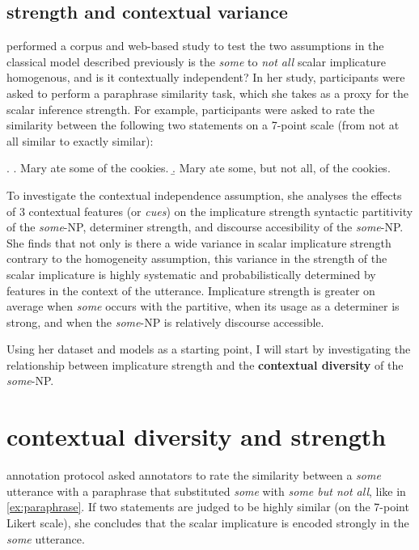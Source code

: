 \documentclass[10pt, biblatex, linguex]{report}
\begin{document}
\subsection{strength and contextual variance}

\citet{degen_investigating_2015} performed a corpus and web-based study to
test the two assumptions in the classical model described previously \dash is
the \textit{some} to \textit{not all} scalar implicature {\rmsc homogenous}, and
is it {\rmsc contextually independent}? In her study, participants were asked to
perform a paraphrase similarity task, which she takes as a proxy for the scalar
inference strength. For example, participants were asked to rate the similarity
between the following two statements on a 7-point scale (from not at all similar
to exactly similar):

\ex. \a. Mary ate some of the cookies.
     \b. Mary ate some, but not all, of the cookies.

To investigate the contextual independence assumption, she analyses the effects
of 3 contextual features (or \textit{cues}) on the implicature strength \dash
syntactic partitivity of the \textit{some}-NP, determiner strength, and
discourse accesibility of the \textit{some}-NP. She finds that not only is there
a wide variance in scalar implicature strength contrary to the homogeneity
assumption, this variance in the strength of the scalar implicature is highly
systematic and probabilistically determined by features in the context of the
utterance. Implicature strength is greater on average when \textit{some} occurs
with the partitive, when its usage as a determiner is strong, and when the
\textit{some}-NP is relatively discourse accessible.

Using her dataset and models as a starting point, I will start by investigating
the relationship between implicature strength and the \textbf{contextual
diversity} of the \textit{some}-NP.

\section{contextual diversity and strength}
\label{sec:context}

 annotation protocol asked annotators to
rate the similarity between a \textit{some} utterance with a paraphrase
that substituted \textit{some} with \textit{some but not all}, like in
\ref{ex:paraphrase}. If two statements are judged to be highly similar (on the
7-point Likert scale), she concludes that the scalar implicature is encoded
strongly in the \textit{some} utterance.
\end{document}
